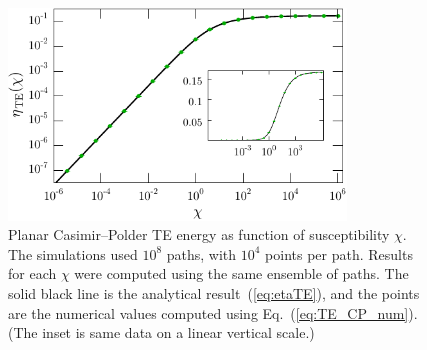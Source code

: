 \begin{figure}
  \centering
 \includegraphics[width=0.8\textwidth]{fig/temp/eff_TE_atom_wall}
  \caption[Planar Casimir--Polder TE energy as function of $\chi$]
  {Planar Casimir--Polder TE energy as function of susceptibility $\chi$.  
    The simulations used $10^8$ paths, with $10^4$ points per path.
    Results for each $\chi$ were computed using the same ensemble of paths.
    The solid black line is the analytical result~(\ref{eq:etaTE}), and the points are the numerical
    values computed using Eq.~(\ref{eq:TE_CP_num}).
    (The inset is same data on a linear vertical scale.)
    }
  \label{fig:eff_TE_atom_wall}
\end{figure}



